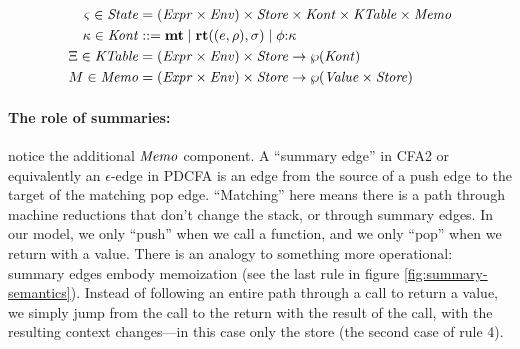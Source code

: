 \begin{align*}
  \varsigma \in \mathit{State} &= (\mathit{Expr} \times \mathit{Env}) \times \mathit{Store} \times \mathit{Kont} \times \mathit{KTable} \times \mathit{Memo} \\
  \kappa \in \mathit{Kont} &::= \mathbf{mt} \mathrel{\mid} \mathbf{rt}((e,\rho),\sigma) \mathrel{\mid} \phi{\tt :} \kappa \\
  \Xi \in \mathit{KTable} &= (\mathit{Expr} \times \mathit{Env})\times \mathit{Store} \to \wp(\mathit{Kont}) \\
  M \in \mathit{Memo} &= (\mathit{Expr} \times \mathit{Env})\times \mathit{Store} \to \wp(\mathit{Value} \times \mathit{Store})
\end{align*}

\paragraph{The role of summaries:} notice the additional $\mathit{Memo}$ component.
%
A ``summary edge'' in CFA2 or equivalently an $\epsilon$-edge in PDCFA is an edge from the source of a push edge to the target of the matching pop edge.
%
``Matching'' here means there is a path through machine reductions that don't change the stack, or through summary edges.
%
In our model, we only ``push'' when we call a function, and we only ``pop'' when we return with a value.
%
There is an analogy to something more operational: summary edges embody memoization (see the last rule in figure \ref{fig:summary-semantics}).
%
Instead of following an entire path through a call to return a value, we simply jump from the call to the return with the result of the call, with the resulting context changes---in this case only the store (the second case of rule 4).

